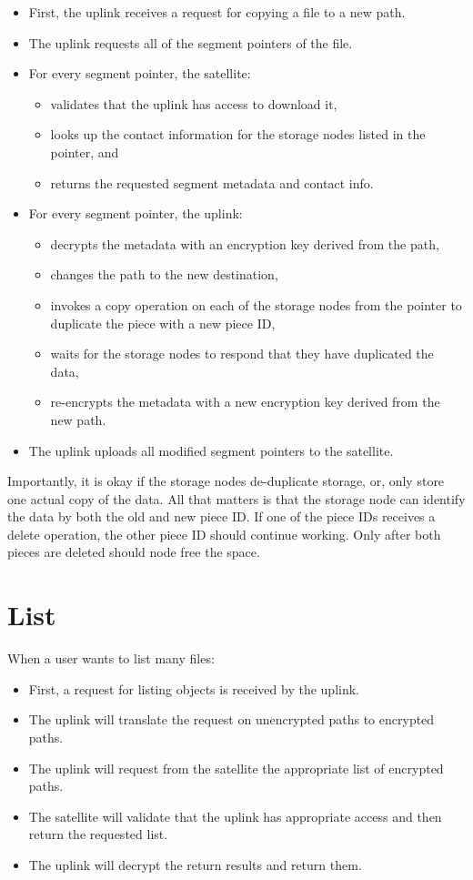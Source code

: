 \documentclass[11pt,fleqn,openany]{book}
\begin{document}
\begin{itemize}
\item First, the uplink receives a request for copying a file to a new path.
\item The uplink requests all of the segment pointers of the file.
\item For every segment pointer, the satellite:
  \begin{itemize}
  \item validates that the uplink has access to download it,
  \item looks up the contact information for the storage nodes listed in the
    pointer, and
  \item returns the requested segment metadata and contact info.
  \end{itemize}
\item For every segment pointer, the uplink:
  \begin{itemize}
  \item decrypts the metadata with an encryption key derived from the path,
  \item changes the path to the new destination,
  \item invokes a copy operation on each of the storage nodes from the pointer
    to duplicate the piece with a new piece ID,
  \item waits for the storage nodes to respond that they have duplicated the
    data,
  \item re-encrypts the metadata with a new encryption key derived from the
    new path.
  \end{itemize}
\item The uplink uploads all modified segment pointers to the satellite.
\end{itemize}

Importantly, it is okay if the storage nodes de-duplicate storage, or, only
store one actual copy of the data. All that matters is that the storage node
can identify the data by both the old and new piece ID. If one of the piece
IDs receives a delete operation, the other piece ID should continue working.
Only after both pieces are deleted should node free the space.

\section{List}

When a user wants to list many files:

\begin{itemize}
\item First, a request for listing objects is received by the uplink.
\item The uplink will translate the request on unencrypted paths to encrypted
  paths.
\item The uplink will request from the satellite the appropriate list of
  encrypted paths.
\item The satellite will validate that the uplink has appropriate access
  and then return the requested list.
\item The uplink will decrypt the return results and return them.
\end{itemize}
\end{document}
